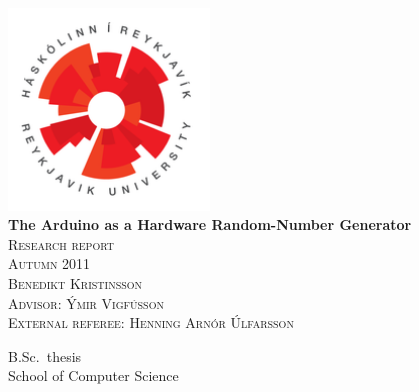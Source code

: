 \documentclass[11pt,english]{amsart}
\date{}
\newcommand{\HRule}{\rule{\linewidth}{0.5mm}}
\begin{document}
\begin{titlepage} 
\begin{center}
\includegraphics[width=0.4\textwidth]{img/ru_logo.png}\\[6cm] 


{ \Large \bfseries The Arduino as a Hardware Random-Number Generator}\\[0.3cm]
\textsc{\Large Research report}\\[0.2cm]

\textsc{\large Autumn 2011}\\[0.2cm]
\textsc{ Benedikt Kristinsson \\Advisor: Ýmir Vigfússon\\External referee: Henning Arnór Úlfarsson}\\[0.8cm]

\vspace*{2.5cm}
\begin{minipage}[t]{0.4\textwidth}
\begin{flushright}
B.Sc.\ thesis \\
School of Computer Science
\end{flushright}
\end{minipage}
\vfill
\end{center}
\end{titlepage}
\end{document}
